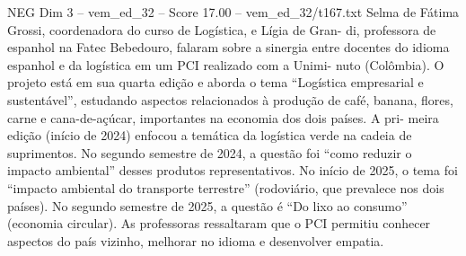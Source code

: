 \begin{textsample}{NEG Dim 3 – vem\_ed\_32 – Score 17.00 – vem\_ed\_32/t167.txt}
Selma de Fátima Grossi, coordenadora do curso de Logística, e Lígia de Gran- di, professora de espanhol na Fatec Bebedouro, falaram sobre a sinergia entre docentes do idioma espanhol e da logística em um PCI realizado com a Unimi- nuto (Colômbia).
O projeto está em sua quarta edição e aborda o tema “Logística empresarial e sustentável”, estudando aspectos relacionados à produção de café, banana, flores, carne e cana-de-açúcar, importantes na economia dos dois países.
A pri- meira edição (início de 2024) enfocou a temática da logística verde na cadeia de suprimentos.
No segundo semestre de 2024, a questão foi “como reduzir o impacto ambiental” desses produtos representativos.
No início de 2025, o tema foi “impacto ambiental do transporte terrestre” (rodoviário, que prevalece nos dois países).
No segundo semestre de 2025, a questão é “Do lixo ao consumo” (economia circular).
As professoras ressaltaram que o PCI permitiu conhecer aspectos do país vizinho, melhorar no idioma e desenvolver empatia.

\end{textsample}
